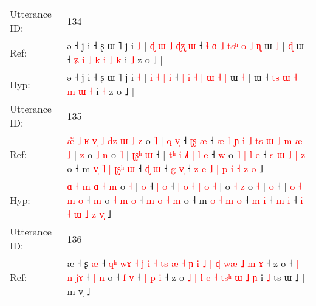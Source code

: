 \documentclass[10pt]{article}
\DeclareRobustCommand{\hl}[1]{{\textcolor{red}{#1}}}
\begin{document}
\begin{longtable}{ll}
 \\
\midrule
Utterance ID: & 134 \\
Ref: & ə ˧ ʝ i ˧ ʂ ɯ ˥ ʝ i \hl{˩} |\hl{ }\hl{ɖ} \hl{ɯ} \hl{˩} \hl{ɖ}\hl{ʐ} \hl{ɯ} ˧ \hl{ɬ} \hl{ɑ} \hl{˩} \hl{t}\hl{s}\hl{ʰ} \hl{o} \hl{˩} \hl{ɳ} ɯ \hl{˩} |\hl{ }\hl{ɖ} ɯ ˧ \hl{ʑ}\hl{ }\hl{i} \hl{˩} \hl{k} \hl{i} \hl{˩} \hl{k} i \hl{˩} z o ˩ |
 \\
Hyp: & ə ˧ ʝ i ˧ ʂ ɯ ˥ ʝ i \hl{˧} |\hl{}\hl{} \hl{i} \hl{˧} \hl{}\hl{|} \hl{i} ˧ \hl{|} \hl{i} \hl{˧} \hl{}\hl{}\hl{|} \hl{ɯ} \hl{˧} \hl{|} ɯ \hl{˧} |\hl{}\hl{} ɯ ˧ \hl{}\hl{t}\hl{s} \hl{ɯ} \hl{˧} \hl{m} \hl{ɯ} \hl{˧} i \hl{˧} z o ˩ |
 \\
\midrule
Utterance ID: & 135 \\
Ref: & \hl{æ}\hl{̃}\hl{ }\hl{˩}\hl{ }\hl{ʁ}\hl{ }\hl{v}\hl{̩} \hl{˩} \hl{d}\hl{z} \hl{ɯ} \hl{˩} \hl{z} o \hl{˥} |\hl{ }\hl{q} \hl{v}\hl{̩} ˧ \hl{ʈ}\hl{ʂ} \hl{æ} ˧\hl{ }\hl{æ}\hl{ }\hl{˥}\hl{ }\hl{ɲ}\hl{ }\hl{i}\hl{ }\hl{˩} \hl{t}\hl{s} \hl{ɯ} \hl{˩} \hl{m} \hl{æ} \hl{˩} |\hl{ }\hl{z} o \hl{˩} \hl{n} o \hl{˥} |\hl{ }\hl{ʈ}\hl{ʂ}\hl{ʰ} \hl{ɯ} ˧ |\hl{ }\hl{t}\hl{ʰ}\hl{ }\hl{i} \hl{˩}\hl{˥} \hl{|} \hl{l} \hl{e} ˧ \hl{w} o\hl{ }\hl{˥} \hl{|} \hl{l} \hl{e} ˧\hl{ }\hl{s} \hl{ɯ} \hl{˩} \hl{|} \hl{z} o ˧ m\hl{ }\hl{v}\hl{̩} \hl{˥} \hl{|} \hl{ʈ}\hl{ʂ}\hl{ʰ} \hl{ɯ} ˧ \hl{ɖ} \hl{ɯ} ˧ \hl{g} \hl{v}\hl{̩} ˧\hl{ }\hl{z}\hl{ }\hl{e} \hl{˩} \hl{|} \hl{p} \hl{i} \hl{˧} \hl{z}\hl{ }\hl{o} ˩
 \\
Hyp: & \hl{}\hl{}\hl{}\hl{}\hl{}\hl{}\hl{}\hl{}\hl{ɑ} \hl{˧} \hl{}\hl{m} \hl{ɑ} \hl{˧} \hl{m} o \hl{˧} |\hl{}\hl{} \hl{}\hl{o} ˧ \hl{}\hl{|} \hl{o} ˧\hl{}\hl{}\hl{}\hl{}\hl{}\hl{}\hl{}\hl{}\hl{}\hl{} \hl{}\hl{|} \hl{o} \hl{˧} \hl{|} \hl{o} \hl{˧} |\hl{}\hl{} o \hl{˧} \hl{z} o \hl{˧} |\hl{}\hl{}\hl{}\hl{} \hl{o} ˧ |\hl{}\hl{}\hl{}\hl{}\hl{} \hl{}\hl{o} \hl{˧} \hl{m} \hl{o} ˧ \hl{m} o\hl{}\hl{} \hl{˧} \hl{m} \hl{o} ˧\hl{}\hl{} \hl{m} \hl{o} \hl{˧} \hl{m} o ˧ m\hl{}\hl{}\hl{} \hl{o} \hl{˧} \hl{}\hl{}\hl{m} \hl{o} ˧ \hl{m} \hl{i} ˧ \hl{m} \hl{}\hl{i} ˧\hl{}\hl{}\hl{}\hl{} \hl{i} \hl{˧} \hl{ɯ} \hl{˩} \hl{z} \hl{}\hl{v}\hl{̩} ˩
 \\
\midrule
Utterance ID: & 136 \\
Ref: & æ ˧ ʂ \hl{æ} ˧\hl{ }\hl{q}\hl{ʰ} \hl{w}\hl{ɤ} \hl{˧} \hl{ʝ} \hl{i} \hl{˧} \hl{t}\hl{s} \hl{æ} \hl{˧} \hl{ɲ} \hl{i} \hl{˩} \hl{|} \hl{ɖ} \hl{w}\hl{æ} \hl{˩} \hl{m} \hl{ɤ} ˧ z o ˧\hl{ }\hl{|} \hl{n} \hl{j}\hl{ɤ} ˧\hl{ }\hl{|} \hl{n} o ˧ \hl{f} \hl{v}\hl{̩} ˧\hl{ }\hl{|} \hl{p} \hl{i} ˧ z o \hl{˩} \hl{|} \hl{l} \hl{e} \hl{˧} \hl{t}\hl{s}\hl{ʰ} \hl{ɯ} \hl{˩} \hl{ɲ} i \hl{˩} ts ɯ ˩ | m v̩ ˩

\end{longtable}
\end{document}
